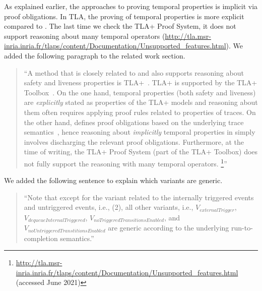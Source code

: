 \documentclass{response}
\begin{document}
\begin{response}
  As explained earlier, the \EventB approaches to proving temporal
  properties is implicit via proof obligations. In TLA, the proving of
  temporal properties is more explicit compared to \EventB. The last
  time we check the TLA+ Proof System, it does not support reasoning
  about many temporal operators
  (\url{http://tla.msr-inria.inria.fr/tlaps/content/Documentation/Unsupported_features.html}).
  We added the following paragraph to the related work section.
\begin{quote}
    ``A method that is closely related to \mbox{\EventB} and also supports
  reasoning about safety and liveness properties is
  TLA+~\mbox{\cite{DBLP:books/aw/Lamport2002}}. TLA+ is supported by
  the TLA+ Toolbox~\mbox{\cite{DBLP:journals/corr/abs-1912-10633}}.
  On the one hand, temporal properties (both safety and liveness) are
  \emph{explicitly} stated as properties of the TLA+ models and
  reasoning about them often requires applying proof rules related to
  properties of traces. On the other hand, \mbox{\EventB} defines
  proof obligations based on the underlying trace
  semantics~\mbox{\cite{abrial10:_model_event_b,hoang2016ltl,hudon16:_unit_b_method}},
  hence reasoning about \emph{implicitly} temporal properties in
  \mbox{\EventB} simply involves discharging the relevant proof
  obligations. Furthermore, at the time of writing, the TLA+ Proof
  System (part of the TLA+ Toolbox) does not fully support the
  reasoning with many temporal operators.%
\footnote{\url{http://tla.msr-inria.inria.fr/tlaps/content/Documentation/Unsupported_features.html}
  (accessed June 2021)}''
  \end{quote}
\end{response}


\begin{comment}{Reviewer \#1}
• It would be interesting to analyze if the proofs are specific to the ex-
ample or to the underlying semantics?
\end{comment}

\begin{response}
  We added the following sentence to explain which variants are
  generic.
  \begin{quote}
    ``Note that except for the variant related to the internally
    triggered events and untriggered events, i.e., (2), all other
    variants, i.e., $V_{externalTrigger}$,
    $V_{dequeueInternalTriggered}$,
    $V_{noTriggeredTransitionsEnabled}$, and
    $V_{noUntriggeredTranstitionsEnabled}$ are generic according to
    the underlying run-to-completion semantics.''
  \end{quote}
\end{response}
 
\end{document}
